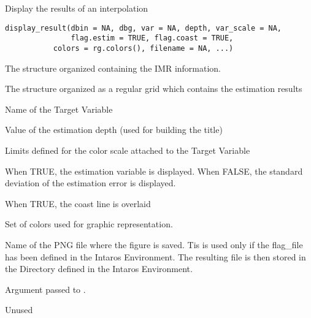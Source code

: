 %
\begin{Description}\relax
Display the results of an interpolation
\end{Description}
%
\begin{Usage}
\begin{verbatim}
display_result(dbin = NA, dbg, var = NA, depth, var_scale = NA,
               flag.estim = TRUE, flag.coast = TRUE,
	       colors = rg.colors(), filename = NA, ...)
\end{verbatim}
\end{Usage}
%
\begin{Arguments}
\begin{ldescription}
\item[\code{dbin}] 
The  structure organized containing the IMR
information.

\item[\code{dbg}] 
The  structure organized as a regular grid which
contains the estimation results

\item[\code{var}] 
Name of the Target Variable

\item[\code{depth}] 
Value of the estimation depth (used for building the title)

\item[\code{var\_scale}] 
Limits defined for the color scale attached to the Target Variable

\item[\code{flag.estim}] 
When TRUE, the estimation variable is displayed.
When FALSE, the standard deviation of the estimation error is displayed.

\item[\code{flag.coast}] 
When TRUE, the coast line is overlaid

\item[\code{colors}] 
Set of colors used for graphic representation.

\item[\code{filename}] 
Name of the PNG file where the figure is saved. Tis is used only if
the flag\_file has been defined in the Intaros Environment.
The resulting file is then stored in the Directory defined in the
Intaros Environment.

\item[\code{...}] 
Argument passed to .

\end{ldescription}
\end{Arguments}
%
\begin{Value}
Unused
\end{Value}
